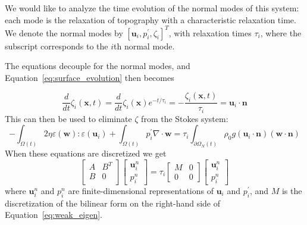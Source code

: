 \documentclass[preprint,12pt,authoryear]{elsarticle}
\begin{document}
We would like to analyze the time evolution of the normal modes of this system: each mode 
is the relaxation of topography with a characteristic relaxation time.  
We denote the normal modes by $\left[ \mathbf{u}_i, p^\prime_i, \zeta_i \right]^T$, with
relaxation times $\tau_i$, where the subscript corresponds to the $i$th normal mode.

The equations decouple for the normal modes, and Equation~\eqref{eq:surface_evolution} then becomes

\begin{equation}
\frac {d}{d t} \zeta_i(\mathbf{x},t) = \frac{d}{dt} \zeta_i(\mathbf{x})e^{-t/\tau_i} = -\frac{\zeta_i(\mathbf{x},t)}{\tau_i} = \mathbf{u}_i \cdot \mathbf{n}
\end{equation}
This can then be used to eliminate $\zeta$ from the Stokes system:
\begin{equation}
-\int_{\Omega(t)} 2 \eta \varepsilon( \mathbf{w} ) \colon \varepsilon( \mathbf{u}_i ) + \int_{\Omega(t)} p^\prime_i \nabla \cdot \mathbf{w} 
= \tau_i \int_{\partial \Omega_N(t)} \rho_0 g (\mathbf{u}_i \cdot \mathbf{n} ) (\mathbf{w} \cdot \mathbf{n})
\label{eq:weak_eigen}
\end{equation}
When these equations are discretized \citep[e.g.][]{kronbichler2012high} we get
\begin{equation}
\begin{bmatrix}
A & B^T \\
B & 0 \\
\end{bmatrix}
\begin{bmatrix}
\mathbf{u}^n_i \\
p^n_i
\end{bmatrix}
=
\tau_i
\begin{bmatrix}
M & 0 \\
0 & 0
\end{bmatrix}
\begin{bmatrix}
\mathbf{u}^n_i \\
p^n_i
\end{bmatrix}
\label{eq:generalized_eigenvalue}
\end{equation}
where $\mathbf{u}^n_i$ and $p^n_i$ are finite-dimensional representations of $\mathbf{u}_i$ and $p^\prime_i$,
and $M$ is the discretization of the bilinear form on the right-hand side of Equation~\eqref{eq:weak_eigen}.
\end{document}
